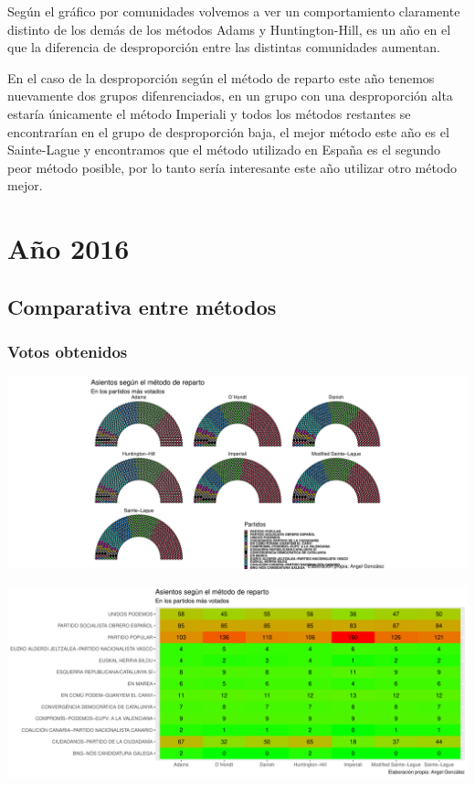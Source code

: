 \documentclass[12pt,a4paper,]{book}
\numberwithin{dummy}{section}
\theoremstyle{ocrenumbox}
\theoremstyle{blacknumex}
\theoremstyle{blacknumbox}
\theoremstyle{ocrenum}
\theoremstyle{ocrenum}
\begin{document}
Según el gráfico por comunidades volvemos a ver un comportamiento
claramente distinto de los demás de los métodos Adams y Huntington-Hill,
es un año en el que la diferencia de desproporción entre las distintas
comunidades aumentan.

En el caso de la desproporción según el método de reparto este año
tenemos nuevamente dos grupos difenrenciados, en un grupo con una
desproporción alta estaría únicamente el método Imperiali y todos los
métodos restantes se encontrarían en el grupo de desproporción baja, el
mejor método este año es el Sainte-Lague y encontramos que el método
utilizado en España es el segundo peor método posible, por lo tanto
sería interesante este año utilizar otro método mejor.

\hypertarget{auxf1o-2016}{%
\section{Año 2016}\label{auxf1o-2016}}

\hypertarget{comparativa-entre-muxe9todos-12}{%
\subsection{Comparativa entre
métodos}\label{comparativa-entre-muxe9todos-12}}

\hypertarget{votos-obtenidos-12}{%
\subsubsection{Votos obtenidos}\label{votos-obtenidos-12}}

\begin{center}\includegraphics[width=0.95\linewidth]{figurasR/unnamed-chunk-119-1} \end{center}

\begin{center}\includegraphics[width=0.95\linewidth]{figurasR/unnamed-chunk-119-2} \end{center}
\end{document}
